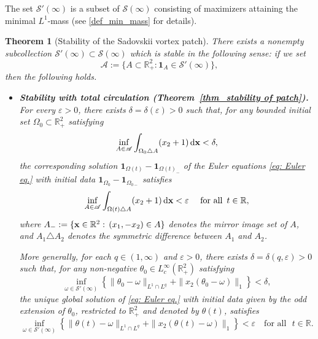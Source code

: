 \documentclass[11pt]{amsart}
\newtheorem{theorem}{Theorem}[section]
\theoremstyle{definition}
\theoremstyle{definition}
\numberwithin{equation}{section}
\newcommand{\set}[1]{\{#1\}}
\newcommand{\0}{\emptyset}
\newcommand{\bfx}{{\bf x}}
\newcommand{\bbR}{\mathbb R}
\newcommand{\calS}{\mathcal S}
\begin{document}
\medskip
\noindent The set $\calS'(\infty)$ is a subset of $\calS(\infty)$ consisting of maximizers attaining the minimal $L^1$-mass (see \eqref{def_min_mass} for details).

	
	
	\begin{theorem}[Stability of the Sadovskii vortex patch]\label{thm_intro_patch}
		There exists a nonempty subcollection $\mathcal{S}'(\infty) \subset \mathcal{S}(\infty)$ which is stable in the following sense: 
		if we set
		\[
		\mathscr{A}:=\{A\subset\mathbb{R}^2_+ : \mathbf{1}_A\in\mathcal{S}'(\infty)\},
		\]
		then the following holds.
		
		\begin{itemize}[itemsep=1em, topsep=1em]
			
			\item[(i)] \textbf{Stability with total circulation {(Theorem~\ref{thm_stability of patch})}.}
			For every $\varepsilon>0$, there exists $\delta=\delta(\varepsilon)>0$ such that, for any bounded initial set $\Omega_0\subset\mathbb{R}^2_+$ satisfying
			\[
			\inf_{A\in\mathscr{A}} \int_{\Omega_0\triangle A}(x_2+1)\,\mathrm{d}\bfx < \delta,
			\]
			the corresponding solution 
			\(\mathbf{1}_{\Omega(t)}-\mathbf{1}_{\Omega(t)_-}\) of the Euler equations \eqref{eq: Euler eq.} with initial data 
			\(\mathbf{1}_{\Omega_0}-\mathbf{1}_{\Omega_{0-}}\) satisfies
			\[
			\inf_{A\in\mathscr{A}} \int_{\Omega(t)\triangle A} (x_2+1)\,\mathrm{d}\bfx < \varepsilon
			\quad \textrm{ for all }\, t\in\bbR,
			\]
			where
              $A_-:=\set{\bfx\in\bbR^2:\,(x_1,-x_2)\in A}$ denotes the mirror image set
            of $A$, and
            $A_1\triangle A_2$ denotes the symmetric difference between $A_1$ and $A_2$.

            \medskip
            {
            \noindent More generally, for each $q \in (1, \infty)$ and $\varepsilon >  0$, there exists $\delta =  \delta(q, \varepsilon) > 0$ such that, for any non-negative $\theta_0 \in L^\infty_c(\bbR^2_+)$ satisfying
            \[
            \inf_{\omega\in\calS'(\infty)} \left\{ \|\theta_0-\omega\|_{L^1\cap L^q} + \|x_2(\theta_0 - \omega)\|_1 \right\} <  \delta,
            \]
            the unique global solution of \eqref{eq: Euler eq.} with initial data given by the odd extension of $\theta_0$, restricted to $\bbR^2_+$ and denoted by $\theta(t)$, satisfies
            \[
            \inf_{\omega\in\calS'(\infty)} \left\{ \|\theta(t)-\omega\|_{L^1\cap L^q} + \|x_2(\theta(t)-\omega)\|_1 \right\} <  \varepsilon \quad\mbox{for all }\,\, t \in \bbR.
            \]
            }
			

\end{itemize}
\end{theorem}
\end{document}
